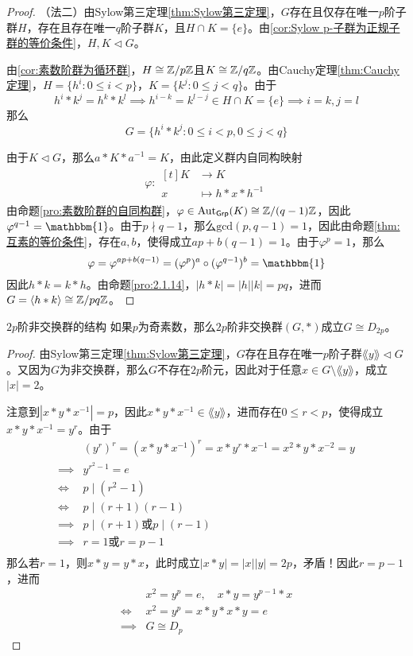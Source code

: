 \begin{proof}
	（法二）由Sylow第三定理\ref{thm:Sylow第三定理}，$G$存在且仅存在唯一$p$阶子群$H$，存在且存在唯一$q$阶子群$K$，且$H\cap K=\{e\}$。由\ref{cor:Sylow p-子群为正规子群的等价条件}，$H,K\lhd G$。
	
	由\ref{cor:素数阶群为循环群}，$H\cong \mathbb{Z}/p\mathbb{Z}$且$K\cong \mathbb{Z}/q\mathbb{Z}$。由Cauchy定理\ref{thm:Cauchy定理}，$H=\{ h^i:0\le i<p \}$，$K=\{ k^j:0\le j<q \}$。由于
	$$
	h^i*k^j=h^k*k^l\implies h^{i-k}=k^{l-j}\in H\cap K=\{e\}\implies i=k,j=l
	$$
	那么
	$$
	G=\{ h^i*k^j:0\le i<p,0\le j<q \}
	$$
	
	由于$K\lhd G$，那么$a*K*a^{-1}=K$，由此定义群内自同构映射
	\begin{align*}
		\varphi:\begin{aligned}[t]
			K&\longrightarrow K\\
			x&\longmapsto h*x*h^{-1}
		\end{aligned}
	\end{align*}
	由命题\ref{pro:素数阶群的自同构群}，$\varphi\in\mathrm{Aut}_{\mathsf{Grp}}(K)\cong \mathbb{Z}/(q-1)\mathbb{Z}$，因此$\varphi^{q-1}=\mathbbm{1}$。由于$p\nmid q-1$，那么$\mathrm{gcd}(p,q-1)=1$，因此由命题\ref{thm:互素的等价条件}，存在$a,b$，使得成立$ap+b(q-1)=1$。由于$\varphi^{p}=1$，那么
	$$
	\varphi=\varphi^{ap+b(q-1)}=(\varphi^p)^a\circ (\varphi^{q-1})^b=\mathbbm{1}
	$$
	因此$h*k=k*h$。由命题\ref{pro:2.1.14}，$|h*k|=|h||k|=pq$，进而$G=\langle h*k \rangle \cong \mathbb{Z}/pq\mathbb{Z}$。
\end{proof}

\begin{corollary}{$2p$阶非交换群的结构}
	如果$p$为奇素数，那么$2p$阶非交换群$(G,*)$成立$G\cong D_{2p}$。
\end{corollary}

\begin{proof}
	由Sylow第三定理\ref{thm:Sylow第三定理}，$G$存在且存在唯一$p$阶子群$\lang y \rang\lhd G$。又因为$G$为非交换群，那么$G$不存在$2p$阶元，因此对于任意$x\in G\setminus\lang y\rang$，成立$|x|=2$。
	
	注意到$|x*y*x^{-1}|=p$，因此$x*y*x^{-1}\in\lang y\rang$，进而存在$0\le r<p$，使得成立$x*y*x^{-1}=y^r$。由于
	\begin{align*}
		&(y^r)^r=(x*y*x^{-1})^r=x*y^r*x^{-1}=x^2*y*x^{-2}=y\\
		\implies & y^{r^2-1}=e\\
		\iff & p\mid (r^2-1)\\
		\iff & p\mid (r+1)(r-1)\\
		\implies & p\mid(r+1)\text{或}p\mid(r-1)\\
		\implies & r=1\text{或}r=p-1\\
	\end{align*}
	那么若$r=1$，则$x*y=y*x$，此时成立$|x*y|=|x||y|=2p$，矛盾！因此$r=p-1$，进而
	\begin{align*}
		&x^2=y^p=e,\quad x*y=y^{p-1}*x\\
		\iff & x^2=y^p=x*y*x*y=e\\
		\implies & G\cong D_p
	\end{align*}
\end{proof}

